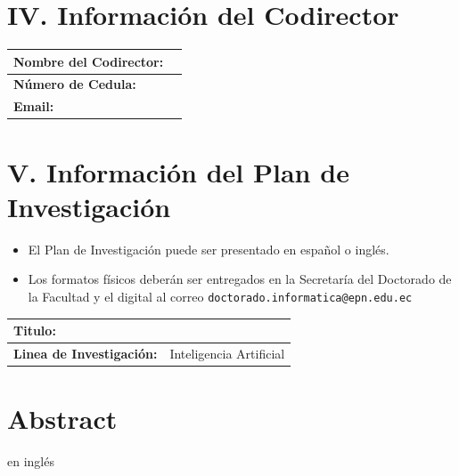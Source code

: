 \documentclass[a4paper,12pt]{article}
\begin{document}
		\section*{IV. Información del Codirector}
	\begin{longtable}{|p{}|p{}|}
	\hline
	\textbf{Nombre del Codirector:} & \\ \hline
	\textbf{Número de Cedula:} & \\ \hline
	\textbf{Email:} & \\ \hline
	\end{longtable}

	\section*{V. Información del Plan de Investigación} 	
	
	 \begin{itemize}
		\item El Plan de Investigación puede ser presentado en español o inglés. 
		\item Los formatos físicos deberán ser entregados en la Secretaría del Doctorado de la Facultad y el digital al correo \texttt{doctorado.informatica@epn.edu.ec}
	\end{itemize} 
	
	\begin{longtable}{|p{}|p{}|}
		\hline
		\textbf{Titulo:} &  \\ \hline
		\textbf{Linea de Investigación:} & Inteligencia Artificial\\ \hline
		
	\end{longtable}
	
\thispagestyle{empty}  %
	\newpage
	\tableofcontents
\newpage
\section*{Abstract} en inglés
	
\end{document}
